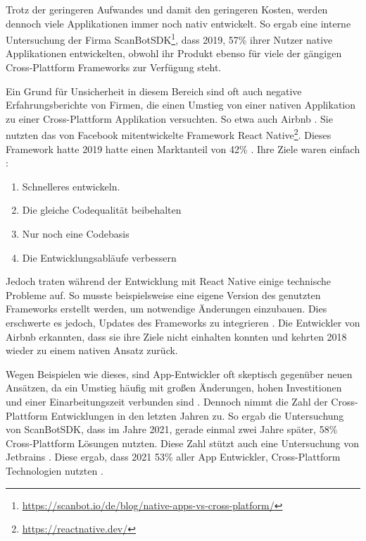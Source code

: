 Trotz der geringeren Aufwandes und damit den geringeren Kosten, werden dennoch viele Applikationen immer noch nativ entwickelt. So ergab eine interne Untersuchung der Firma ScanBotSDK\footnote{\label{scanbot_footnote}\url{https://scanbot.io/de/blog/native-apps-vs-cross-platform/}}, dass 2019, 57\% ihrer Nutzer native Applikationen entwickelten, obwohl ihr Produkt ebenso für viele der gängigen Cross-Plattform Frameworks zur Verfügung steht.

Ein Grund für Unsicherheit in diesem Bereich sind oft auch negative Erfahrungsberichte von Firmen, die einen Umstieg von einer nativen Applikation zu einer Cross-Plattform Applikation versuchten. So etwa auch Airbnb \cite{Airbnb_react_goals}. Sie nutzten das von Facebook mitentwickelte Framework React Native\footnote{\url{https://reactnative.dev/}}. Dieses Framework hatte 2019 hatte einen Marktanteil von 42\% \cite{statist_CP_Framework}. 
\break
Ihre Ziele waren einfach \cite{statist_CP_Framework}:
\begin{enumerate}%
    \item Schnelleres entwickeln.
    \item Die gleiche Codequalität beibehalten
    \item Nur noch eine Codebasis
    \item Die Entwicklungsabläufe verbessern
\end{enumerate}
\nointerlineskip
Jedoch traten während der Entwicklung mit React Native einige technische Probleme auf. So musste beispielsweise eine eigene Version des genutzten Frameworks erstellt werden, um notwendige Änderungen einzubauen. Dies erschwerte es jedoch, Updates des Frameworks zu integrieren \cite{Airbnb_technology}. Die Entwickler von Airbnb erkannten, dass sie ihre Ziele nicht einhalten konnten und kehrten 2018 wieder zu einem nativen Ansatz zurück.

Wegen Beispielen wie dieses, sind App-Entwickler oft skeptisch gegenüber neuen Ansätzen, da ein Umstieg häufig mit großen Änderungen, hohen Investitionen und einer Einarbeitungszeit verbunden sind \cite{medium_Lehtimäki}. Dennoch nimmt die Zahl der Cross-Plattform Entwicklungen in den letzten Jahren zu. 
So ergab die Untersuchung von ScanBotSDK, dass im Jahre 2021, gerade einmal zwei Jahre später, 58\% Cross-Plattform Lösungen nutzten. Diese Zahl stützt auch eine Untersuchung von Jetbrains \cite{JetBrains_miscellaneous_2021}. Diese ergab, dass 2021 53\% aller App Entwickler, Cross-Plattform Technologien nutzten .

